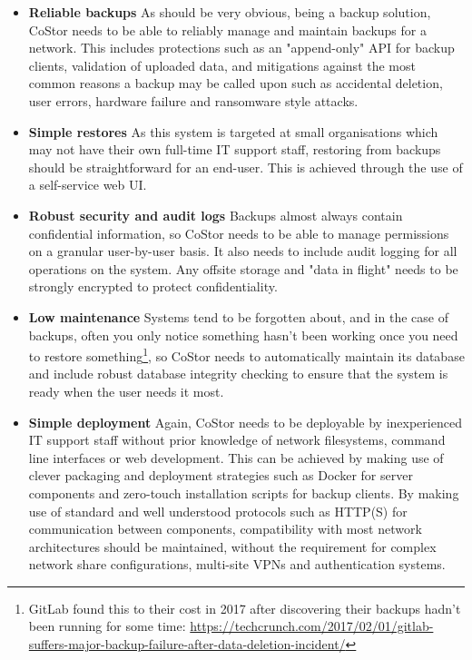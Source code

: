 \documentclass[bsc,frontabs,twoside,singlespacing,parskip,deptreport]{infthesis}     %
\begin{document}
\begin{itemize}
	\item \textbf{Reliable backups}
		\subitem As should be very obvious, being a backup solution, CoStor needs to be
		able to reliably manage and maintain backups for a network. This includes
		protections such as an "append-only" API for backup clients, validation of 
		uploaded data, and mitigations against the most common reasons a backup
		may be called upon such as accidental deletion, user errors, hardware failure and 
		ransomware style attacks.
	\item \textbf{Simple restores}
		\subitem As this system is targeted at small organisations which may not have their
		own full-time IT support staff, restoring from backups should be straightforward 
		for an end-user. This is achieved through the use of a self-service web UI.
	\item \textbf{Robust security and audit logs}
		\subitem Backups almost always contain confidential information, so CoStor needs 
		to be able to manage permissions on a granular user-by-user basis. It also needs 
		to include audit logging for all operations on the system. Any offsite storage and
		"data in flight" needs to be strongly encrypted to protect confidentiality.
	\item \textbf{Low maintenance}
		\subitem Systems tend to be forgotten about, and in the case of backups, often you
		only notice something hasn't been working once you need to restore 
		something\footnote{GitLab found this to their cost in 2017 after discovering their 
		backups hadn't been running for some time: 
		\url{https://techcrunch.com/2017/02/01/gitlab-suffers-major-backup-failure-after-data-deletion-incident/}},
		so CoStor needs to automatically maintain its database and include robust database 
		integrity checking to ensure that the system is ready when the user needs it most.
	\item \textbf{Simple deployment}
		\subitem Again, CoStor needs to be deployable by inexperienced IT support staff
		without prior knowledge of network filesystems, command line interfaces or web
		development. This can be achieved by making use of clever packaging and deployment 
		strategies such as Docker for server components and zero-touch installation scripts
		for backup clients. By making use of standard and well understood protocols such
		as HTTP(S) for communication between components, compatibility with most network
		architectures should be maintained, without the requirement for complex network 
		share configurations, multi-site VPNs and authentication systems.

\end{itemize}
\end{document}
